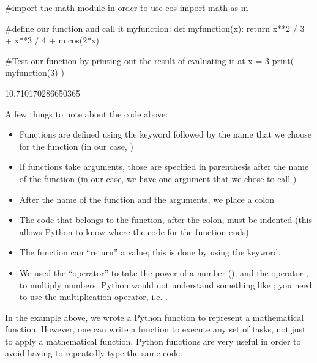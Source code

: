 \begin{python}[caption=Defining a function] 
#import the math module in order to use cos
import math as m

#define our function and call it myfunction:
def myfunction(x):
  return x**2 / 3 + x**3 / 4 + m.cos(2*x)
  
#Test our function by printing out the result of evaluating it at x = 3
print( myfunction(3) )  
\end{python}
\begin{poutput}
10.710170286650365
\end{poutput}
A few things to note about the code above:
\begin{itemize}
\item Functions are defined using the  keyword followed by the name that we choose for the function (in our case, )
\item If functions take arguments, those are specified in parenthesis after the name of the function (in our case, we have one argument that we chose to call )
\item After the name of the function and the arguments, we place a colon
\item The code that belongs to the function, after the colon, must be indented (this allows Python to know where the code for the function ends)
\item The function can ``return'' a value; this is done by using the  keyword. 
\item We used the ``operator'' \code{**} to take the power of a number (), and the operator \code{*}, to multiply numbers. Python would not understand something like ; you need to use the multiplication operator, i.e. .
\end{itemize}
In the example above, we wrote a Python function to represent a mathematical function. However, one can write a function to execute any set of tasks, not just to apply a mathematical function. Python functions are very useful in order to avoid having to repeatedly type the same code. 

